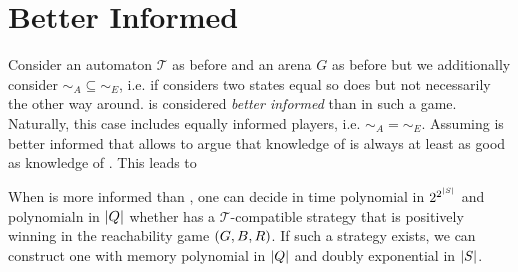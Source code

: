 \section{Better Informed \adam{}}
Consider an automaton $\mathcal{T}$ as before and an arena $G$ as before but we
additionally consider $\sim_{A} \subseteq \sim_{E}$, i.e. if \adam{} considers
two states equal so does \eve{} but not necessarily the other way around. 
\adam{} is considered \emph{better informed} than \eve{} in such a game. 
Naturally, this case includes equally informed players, i.e. 
$\sim_{A} = \sim_{E}$. Assuming \adam{} is better informed that \eve{} allows
to argue that knowledge of \adam{} is always at least as good as knowledge of
\eve{}. This leads to
\begin{theorem}
  When \adam{} is more informed than \eve{}, one can decide in time polynomial
  in $2^{2^{\left\vert{S}\right\vert}}$ and polynomialn in $\left\vert{Q}\right\vert$ whether \eve{} has a 
  $\mathcal{T}$-compatible strategy that is positively winning in the 
  reachability game $\left(G, B, R\right)$. If such a strategy exists, we can 
  construct one with memory polynomial in $\left\vert{Q}\right\vert$ and doubly exponential in
  $\left\vert{S}\right\vert$.
  \label{thm:MoreInfAdamStrat}
\end{theorem}
